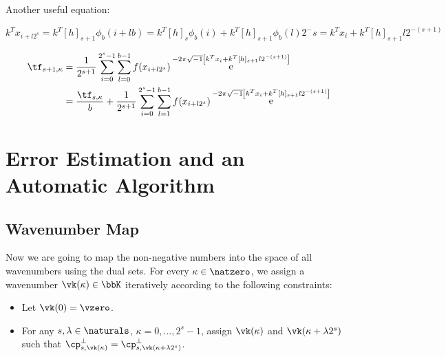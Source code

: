 \documentclass[]{elsarticle}
\DeclareMathOperator{\e}{e}
\newcommand{\cfourier}[1]{\ensuremath{\e^{-2\pi\sqrt{-1}#1}}}
\theoremstyle{definition}
\theoremstyle{remark}
\begin{document}
Another useful equation:

\begin{equation*}
k^Tx_{i+l2^s}=k^T[h]_{s+1}\phi_b(i+lb)=k^T[h]_s\phi_b(i)+k^T[h]_{s+1}\phi_b(l)2^-s=k^Tx_{i}+k^T[h]_{s+1}l2^{-(s+1)}
\end{equation*}

\begin{equation*}
\begin{split}
\tf_{s+1,\kappa}&=\frac{1}{2^{s+1}}\sum_{i=0}^{2^s-1}\sum_{l=0}^{b-1}f(x_{i+l2^s})\cfourier{\left[k^Tx_{i}+k^T[h]_{s+1}l2^{-(s+1)}\right]}\\
&=\frac{\tf_{s,\kappa}}{b}+\frac{1}{2^{s+1}}\sum_{i=0}^{2^s-1}\sum_{l=1}^{b-1}f(x_{i+l2^s})\cfourier{\left[k^Tx_{i}+k^T[h]_{s+1}l2^{-(s+1)}\right]}
\end{split}
\end{equation*}

\section{Error Estimation and an Automatic Algorithm}

\subsection{Wavenumber Map}

Now we are going to map the non-negative numbers into the space of all wavenumbers using the dual sets.  For every $\kappa \in \natzero$, we assign a wavenumber $\vk(\kappa) \in \bbK$ iteratively according to the following constraints:
\begin{itemize}

\item Let $\vk(0)= \vzero$.

\item For any $s,\lambda \in \naturals$, $\kappa=0, \ldots, 2^s-1$, assign $\vk(\kappa)$ and $\vk(\kappa+ \lambda 2^s)$ such that $\cp^{\perp}_{s,\vk(\kappa)}=\cp^{\perp}_{s,\vk(\kappa+ \lambda 2^s)}$.
\end{itemize}
\end{document}
